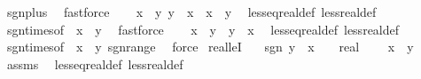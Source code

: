 \begin{isabellebody}
\ sgn{\isacharunderscore}{\kern0pt}plus\ \isamarkupfalse%
\ fastforce\isanewline
\ \ \isamarkupfalse%
\ {\isachardoublequoteopen}{\isasymlbrakk}x\ {\isasymle}\ y{\isacharsemicolon}{\kern0pt}\ y\ {\isasymle}\ x{\isasymrbrakk}\ {\isasymLongrightarrow}\ x\ {\isacharequal}{\kern0pt}\ y{\isachardoublequoteclose}\ \isamarkupfalse%
\ less{\isacharunderscore}{\kern0pt}eq{\isacharunderscore}{\kern0pt}real{\isacharunderscore}{\kern0pt}def\ less{\isacharunderscore}{\kern0pt}real{\isacharunderscore}{\kern0pt}def\ \isamarkupfalse%
\ sgn{\isacharunderscore}{\kern0pt}times{\isacharbrackleft}{\kern0pt}of\ {\isachardoublequoteopen}{\isacharminus}{\kern0pt}{}{\isachardoublequoteclose}\ {\isachardoublequoteopen}x\ {\isacharminus}{\kern0pt}\ y{\isachardoublequoteclose}{\isacharbrackright}{\kern0pt}\ \isamarkupfalse%
\ fastforce\isanewline
\ \ \isamarkupfalse%
\ {\isachardoublequoteopen}x\ {\isasymle}\ y\ {\isasymor}\ y\ {\isasymle}\ x{\isachardoublequoteclose}\ \isamarkupfalse%
\ less{\isacharunderscore}{\kern0pt}eq{\isacharunderscore}{\kern0pt}real{\isacharunderscore}{\kern0pt}def\ less{\isacharunderscore}{\kern0pt}real{\isacharunderscore}{\kern0pt}def\ \isamarkupfalse%
\ sgn{\isacharunderscore}{\kern0pt}times{\isacharbrackleft}{\kern0pt}of\ {\isachardoublequoteopen}{\isacharminus}{\kern0pt}{}{\isachardoublequoteclose}\ {\isachardoublequoteopen}x\ {\isacharminus}{\kern0pt}\ y{\isachardoublequoteclose}{\isacharbrackright}{\kern0pt}\ sgn{\isacharunderscore}{\kern0pt}range\ \isamarkupfalse%
\ force\isanewline
{}\isamarkupfalse%
%
\endisatagproof
{\isafoldproof}%
%
\isadelimproof
\isanewline
%
\endisadelimproof
\isanewline
\isanewline
{}\isamarkupfalse%
\ real{\isacharunderscore}{\kern0pt}leI{\isacharcolon}{\kern0pt}\isanewline
\ \ \ {\isachardoublequoteopen}sgn\ {\isacharparenleft}{\kern0pt}y\ {\isacharminus}{\kern0pt}\ x{\isacharparenright}{\kern0pt}\ {\isasymin}\ {\isacharbraceleft}{\kern0pt}{}\ {\isacharcolon}{\kern0pt}{\isacharcolon}{\kern0pt}\ real{\isacharcomma}{\kern0pt}\ {}{\isacharbraceright}{\kern0pt}{\isachardoublequoteclose}\isanewline
\ \ \ {\isachardoublequoteopen}x\ {\isasymle}\ y{\isachardoublequoteclose}\isanewline
%
\isadelimproof
\ \ %
\endisadelimproof
%
\isatagproof
{}\isamarkupfalse%
\ assms\ \isamarkupfalse%
\ less{\isacharunderscore}{\kern0pt}eq{\isacharunderscore}{\kern0pt}real{\isacharunderscore}{\kern0pt}def\ less{\isacharunderscore}{\kern0pt}real{\isacharunderscore}{\kern0pt}def\ \isamarkupfalse%

\end{isabellebody}
